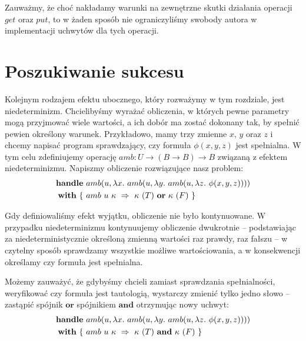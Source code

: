 Zauważmy, że choć nakładamy warunki na zewnętrzne skutki działania operacji \(get\) oraz \(put\), to w żaden sposób nie ograniczyliśmy swobody autora w implementacji uchwytów dla tych operacji.


\section{Poszukiwanie sukcesu}

Kolejnym rodzajem efektu ubocznego, który rozważymy w tym rozdziale, jest niedeterminizm. Chcielibyśmy wyrażać obliczenia, w których pewne parametry mogą przyjmować wiele wartości, a ich dobór ma zostać dokonany tak, by spełnić pewien określony warunek. Przykładowo, mamy trzy zmienne \(x,\, y\) oraz \(z\) i chcemy napisać program sprawdzający, czy formuła \(\phi(x, y, z)\) jest spełnialna. W tym celu zdefiniujemy operację \(amb: U \rightarrow (B \rightarrow B) \rightarrow B\) związaną z efektem niedeterminizmu. Napiszmy obliczenie rozwiązujące nasz problem:
\begin{equation}\begin{split}
  \handle{
    &\op{amb}{u}{\fun{x}{
        \op{amb}{u}{\fun{y}{
            \op{amb}{u}{\fun{z}{
                \phi(x, y, z)
            }}
        }}
    }}\\
  }{ \{ \ &\hcase{amb}{u\ \kappa}{ \kappa\ (T) \ \mathbf{or} \ \kappa\ (F) } \ \} }
\end{split}\end{equation}

Gdy definiowaliśmy efekt wyjątku, obliczenie nie było kontynuowane. W przypadku niedeterminizmu kontynuujemy obliczenie dwukrotnie -- podstawiając za niedeterministycznie określoną zmienną wartości raz prawdy, raz fałszu -- w czytelny sposób sprawdzamy wszystkie możliwe wartościowania, a w konsekwencji określamy czy formuła jest spełnialna.

Możemy zauważyć, że gdybyśmy chcieli zamiast sprawdzania spełnialności, weryfikować czy formuła jest tautologią, wystarczy zmienić tylko jedno słowo -- zastąpić spójnik \(\mathbf{or}\) spójnikiem \(\mathbf{and}\) otrzymując nowy uchwyt:
\begin{equation}\begin{split}
  \handle{
    &\op{amb}{u}{\fun{x}{
        \op{amb}{u}{\fun{y}{
            \op{amb}{u}{\fun{z}{
                \phi(x, y, z)
            }}
        }}
    }}\\
  }{ \{ \ &\hcase{amb}{u\ \kappa}{ \kappa\ (T) \ \mathbf{and} \ \kappa\ (F) } \ \} }
\end{split}\end{equation}

